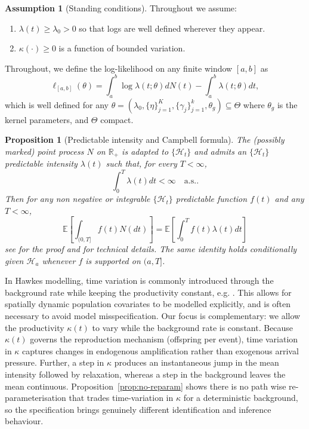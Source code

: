 \documentclass{article}
\theoremstyle{plain}
\newtheorem{proposition}[theorem]{Proposition}
\theoremstyle{definition}
\newtheorem{assumption}[theorem]{Assumption}
\newcommand{\E}{\mathbb{E}}
\newcommand{\1}{\mathbf{1}}
\begin{document}
    \begin{assumption}[Standing conditions]
    \label{ass:standing}
    Throughout we assume:
    \begin{enumerate}[leftmargin=2em,itemsep=0.25em]
    \item[(i)] $\lambda(t)\ge\lambda_0>0$ so that logs are well defined wherever they appear.
    \item[(ii)] $\kappa(\cdot)\ge 0$ is a function of bounded variation.
    \end{enumerate}
    \end{assumption}
    Throughout, we define the log-likelihood on any finite window $[a,b]$ as \begin{equation}\label{eqn:liklihoodAB}
    \ell_{[a,b]}(\theta)
    =\int_a^b \log \lambda(t;\theta) dN(t)-\int_a^b \lambda(t;\theta) dt,
    \end{equation} which is well defined for any $\theta=(\lambda_0,\{\eta\}_{j=1}^K, \{\gamma_j\}_{j=1}^k,\theta_g)\subseteq \Theta$ where $\theta_g$ is the kernel parameters, and $\Theta$ compact.
    
    \begin{proposition}[Predictable intensity and Campbell formula]
    \label{ass:campbell}
    The (possibly marked) point process $N$ on $\mathbb R_+$ is adapted to $\{\mathcal H_t\}$ and admits an $\{\mathcal H_t\}$  predictable intensity $\lambda(t)$ such that, for every $T<\infty$,
    \[
    \int_0^T \lambda(t) dt<\infty\quad\text{a.s.}.
    \]
    Then for any non negative or integrable  $\{\mathcal H_t\}$  predictable function $f(t)$ and any $T<\infty$,
    \[
    \E \left[\int_{(0,T]} f(t) N(dt)\right]
    =
    \E \left[\int_0^T  f(t) \lambda(t)dt\right]
    \]
    see \cite[Proposition 14.2.1]{daley2007introduction} for the proof and 
    \cite{kresin2023parametric,van2010spatial} for technical details. The same identity holds conditionally given $\mathcal H_a$ whenever $f$ is supported on $(a,T]$.
    \end{proposition}
    
    In Hawkes modelling, time variation is commonly introduced through the background rate while keeping the productivity constant, e.g. \cite{omi2017hawkes}. This allows for spatially dynamic population covariates to be modelled explicitly, and is often necessary to avoid model misspecification. Our focus is complementary: we allow the productivity $\kappa(t)$ to vary while the background rate is constant. Because $\kappa(t)$ governs the reproduction mechanism (offspring per event), time variation in $\kappa$ captures changes in endogenous amplification rather than exogenous arrival pressure. Further, a step in $\kappa$ produces an instantaneous jump in the mean intensity followed by relaxation, whereas a step in the background leaves the mean continuous. Proposition~\ref{prop:no-reparam} shows there is no path wise re-parameterisation that trades time-variation in $\kappa$ for a deterministic background, so the specification brings genuinely different identification and inference behaviour.
    
\end{document}
